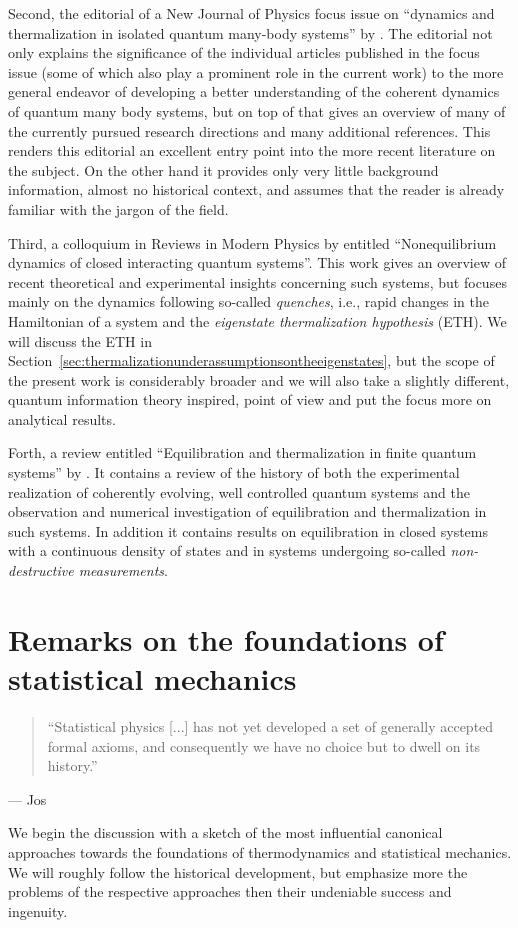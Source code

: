 \documentclass[a4paper,12pt,listof=totoc,index=totoc,bibliography=totoc,headsepline=false,headings=normal,BCOR16.153846mm,DIV12,headinclude,twoside,cleardoublepage=empty,numbers=noenddot,final]{scrreprt}
\theoremstyle{mystyle}
\numberwithin{equation}{section}
\numberwithin{figure}{section}
\numberwithin{lemma}{section}
\numberwithin{theorem}{section}
\numberwithin{corollary}{section}
\numberwithin{definition}{section}
\numberwithin{conjecture}{section}
\numberwithin{observation}{section}
\newcommand{\+}{\mkern2mu}
\DeclareMathOperator{\1}{\mathds{1}}
\begin{document}
Second, the editorial of a New Journal of Physics focus issue on ``dynamics and thermalization in isolated quantum many-body systems'' by \textcite{Cazalilla2010}.
The editorial not only explains the significance of the individual articles published in the focus issue (some of which also play a prominent role in the current work) to the more general endeavor of developing a better understanding of the coherent dynamics of quantum many body systems, but on top of that gives an overview of many of the currently pursued research directions and many additional references.
This renders this editorial an excellent entry point into the more recent literature on the subject.
On the other hand it provides only very little background information, almost no historical context, and assumes that the reader is already familiar with the jargon of the field.

Third, a colloquium in Reviews in Modern Physics by \textcite{Polkovnikov11} entitled ``Nonequilibrium dynamics of closed interacting quantum systems''.
This work gives an overview of recent theoretical and experimental insights concerning such systems, but focuses mainly on the dynamics following so-called \emph{quenches}, i.e., rapid changes in the Hamiltonian of a system and the \emph{eigenstate thermalization hypothesis} (ETH).
We will discuss the ETH in Section~\ref{sec:thermalizationunderassumptionsontheeigenstates}, but the scope of the present work is considerably broader and we will also take a slightly different, quantum information theory inspired, point of view and put the focus more on analytical results.

Forth, a review entitled ``Equilibration and thermalization in finite quantum systems'' by \textcite{Yukalov2011}.
It contains a review of the history of both the experimental realization of coherently evolving, well controlled quantum systems and the observation and numerical investigation of equilibration and thermalization in such systems.
In addition it contains results on equilibration in closed systems with a continuous density of states and in systems undergoing so-called \emph{non-destructive measurements}.


\chapter{Remarks on the foundations of statistical mechanics}
\label{chap:remarksonthefoundationsofstatmech}
%
\begin{quotation}
  ``Statistical physics [...] has not yet developed a set of generally accepted formal axioms, and consequently we have no choice but to dwell on its history.''
\end{quotation}
\begin{flushright}
  --- Jos \textcite{UffinkFinal}
\end{flushright}
%
We begin the discussion with a sketch of the most influential canonical approaches towards the foundations of thermodynamics and statistical mechanics.
We will roughly follow the historical development, but emphasize more the problems of the respective approaches then their undeniable success and ingenuity.
\end{document}
